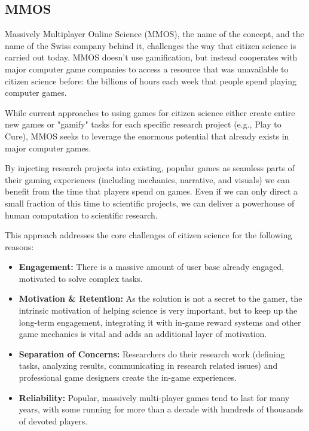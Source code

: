 
\subsection{MMOS}

	Massively Multiplayer Online Science (MMOS), the name of the concept, and the name of the Swiss company behind it, challenges the way that citizen science is carried out today. MMOS doesn't use gamification, but instead cooperates with major computer game companies to access a resource that was unavailable to citizen science before: the billions of hours each week that people spend playing computer games.

	While current approaches to using games for citizen science either create entire new games or "gamify" tasks for each specific research project (e.g., Play to Cure), MMOS seeks to leverage the enormous potential that already exists in major computer games. 

	By injecting research projects into existing, popular games as seamless parts of their gaming experiences (including mechanics, narrative, and visuals) we can benefit from the time that players spend on games. Even if we can only direct a small fraction of this time to scientific projects, we can deliver a powerhouse of human computation to scientific research.

	This approach addresses the core challenges of citizen science for the following reasons:

	\begin{itemize}
	  \item {\bf Engagement:} There is a massive amount of user base already engaged, motivated to solve complex tasks.
	  \item {\bf Motivation \& Retention:} As the solution is not a secret to the gamer, the intrinsic motivation of helping science is very important, but to keep up the long-term engagement, integrating it with in-game reward systems and other game mechanics is vital and adds an additional layer of motivation.
	  \item {\bf Separation of Concerns:} Researchers do their research work (defining tasks, analyzing results, communicating in research related issues) and professional game designers create the in-game experiences.
	  \item {\bf Reliability:} Popular, massively multi-player games tend to last for many years, with some running for more than a decade with hundreds of thousands of devoted players.
	\end{itemize}


